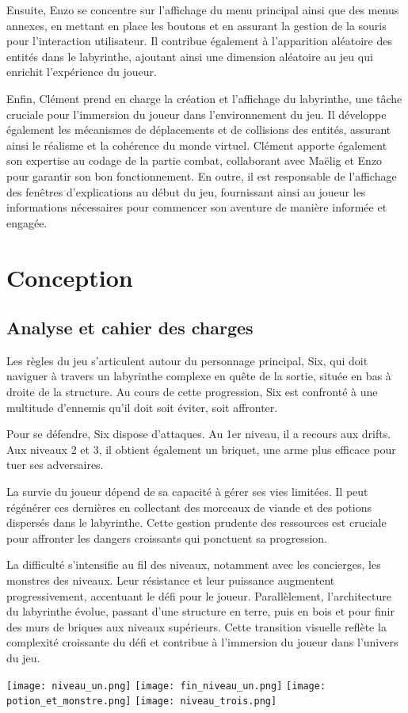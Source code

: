 \documentclass[10pt]{article}
\begin{document}
\begin{center}
Ensuite, Enzo se concentre sur l'affichage du menu principal ainsi que des menus annexes, en mettant en place les boutons et en assurant la gestion de la souris pour l'interaction utilisateur. Il contribue également à l'apparition aléatoire des entités dans le labyrinthe, ajoutant ainsi une dimension aléatoire au jeu qui enrichit l'expérience du joueur.

Enfin, Clément prend en charge la création et l'affichage du labyrinthe, une tâche cruciale pour l'immersion du joueur dans l'environnement du jeu. Il développe également les mécanismes de déplacements et de collisions des entités, assurant ainsi le réalisme et la cohérence du monde virtuel. Clément apporte également son expertise au codage de la partie combat, collaborant avec Maëlig et Enzo pour garantir son bon fonctionnement. En outre, il est responsable de l'affichage des fenêtres d'explications au début du jeu, fournissant ainsi au joueur les informations nécessaires pour commencer son aventure de manière informée et engagée.

\section{Conception}
\subsection{Analyse et cahier des charges}
Les règles du jeu s'articulent autour du personnage principal, Six, qui doit naviguer à travers un \gls{labyrinthe} complexe en quête de la sortie, située en bas à droite de la structure. Au cours de cette progression, Six est confronté à une multitude d'\gls{ennemis} qu'il doit soit éviter, soit affronter.

Pour se défendre, Six dispose d'attaques. Au 1er niveau, il a recours aux \gls{drifts}. Aux niveaux 2 et 3, il obtient également un \gls{briquet}, une arme plus efficace pour tuer ses adversaires.

La survie du joueur dépend de sa capacité à gérer ses vies limitées. Il peut régénérer ces dernières en collectant des morceaux de viande et des potions dispersés dans le labyrinthe. Cette gestion prudente des ressources est cruciale pour affronter les dangers croissants qui ponctuent sa progression.

La difficulté s'intensifie au fil des niveaux, notamment avec les \gls{concierges}, les monstres des niveaux. Leur résistance et leur puissance augmentent progressivement, accentuant le défi pour le joueur. Parallèlement, l'architecture du labyrinthe évolue, passant d'une structure en terre, puis en bois et pour finir des murs de briques aux niveaux supérieurs. Cette transition visuelle reflète la complexité croissante du défi et contribue à l'immersion du joueur dans l'univers du jeu.
\begin{center}
\texttt{[image: niveau\_un.png]}
\texttt{[image: fin\_niveau\_un.png]}
\texttt{[image: potion\_et\_monstre.png]}
\texttt{[image: niveau\_trois.png]}


\end{center}
\end{center}
\end{document}
